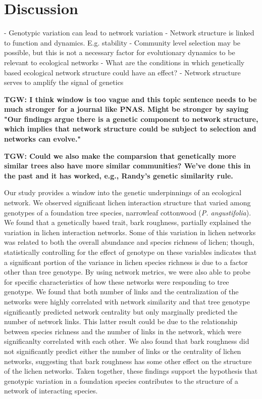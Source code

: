 \documentclass[9pt,twocolumn,twoside,lineno]{pnas-new}
\begin{document}
\section*{Discussion}


- Genotypic variation can lead to network variation
- Network structure is linked to function and dynamics. E.g. stability
- Community level selection may be possible, but this is not a
necessary factor for evolutionary dynamics to be relevant to ecological networks
- What are the conditions in which genetically based ecological network structure could have an effect?
- Network structure serves to amplify the signal of genetics


\textbf{TGW: I think window is too vague and this topic sentence needs
  to be much stronger for a journal like PNAS.  Might be stronger by
  saying "Our findings argue there is a genetic component to network
  structure, which implies that network structure could be subject to
  selection and networks can evolve."}

\textbf{TGW: Could we also make the comparsion that genetically more
  similar trees also have more similar communities?  We've done this
  in the past and it has worked, e.g., Randy's genetic similarity
  rule.}

Our study provides a window into the genetic underpinnings of an
ecological network. We observed significant lichen interaction
structure that varied among genotypes of a foundation tree species,
narrowleaf cottonwood (\textit{P. angustifolia}). We found that a
genetically based trait, bark roughness, partially explained the
variation in lichen interaction networks. Some of this variation in
lichen networks was related to both the overall abundance and species
richness of lichen; though, statistically controlling for the effect
of genotype on these variables indicates that a significant portion of
the variance in lichen species richness is due to a factor other than
tree genotype. By using network metrics, we were also able to probe
for specific characteristics of how these networks were responding to
tree genotype. We found that both number of links and the
centralization of the networks were highly correlated with network
similarity and that tree genotype significantly predicted network
centrality but only marginally predicted the number of network
links. This latter result could be due to the relationship between
species richness and the number of links in the network, which were
significanlty correlated with each other. We also found that bark
roughness did not significantly predict either the number of links or
the centrality of lichen networks, suggesting that bark roughness has
some other effect on the structure of the lichen networks. Taken
together, these findings support the hypothesis that genotypic
variation in a foundation species contributes to the structure of a
network of interacting species.
\end{document}

